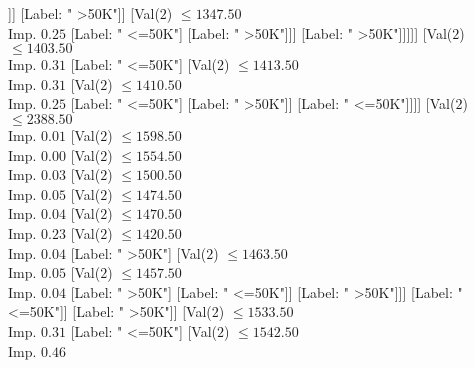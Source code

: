 \documentclass[margin=10pt]{standalone}
\begin{document}
\begin{forest}
																																	[Label: " >50K"]
																																	[Val($2$) $ \leq 1306.50$ \\ Imp. $0.02$
																																		[Label: " <=50K"]
																																		[Label: " >50K"]]]
																																[Label: " >50K"]]
																															[Val($2$) $ \leq 1347.50$ \\ Imp. $0.25$
																																[Label: " <=50K"]
																																[Label: " >50K"]]]
																														[Label: " >50K"]]]]]
																										[Val($2$) $ \leq 1403.50$ \\ Imp. $0.31$
																											[Label: " <=50K"]
																											[Val($2$) $ \leq 1413.50$ \\ Imp. $0.31$
																												[Val($2$) $ \leq 1410.50$ \\ Imp. $0.25$
																													[Label: " <=50K"]
																													[Label: " >50K"]]
																												[Label: " <=50K"]]]]
																									[Val($2$) $ \leq 2388.50$ \\ Imp. $0.01$
																										[Val($2$) $ \leq 1598.50$ \\ Imp. $0.00$
																											[Val($2$) $ \leq 1554.50$ \\ Imp. $0.03$
																												[Val($2$) $ \leq 1500.50$ \\ Imp. $0.05$
																													[Val($2$) $ \leq 1474.50$ \\ Imp. $0.04$
																														[Val($2$) $ \leq 1470.50$ \\ Imp. $0.23$
																															[Val($2$) $ \leq 1420.50$ \\ Imp. $0.04$
																																[Label: " >50K"]
																																[Val($2$) $ \leq 1463.50$ \\ Imp. $0.05$
																																	[Val($2$) $ \leq 1457.50$ \\ Imp. $0.04$
																																		[Label: " >50K"]
																																		[Label: " <=50K"]]
																																	[Label: " >50K"]]]
																															[Label: " <=50K"]]
																														[Label: " >50K"]]
																													[Val($2$) $ \leq 1533.50$ \\ Imp. $0.31$
																														[Label: " <=50K"]
																														[Val($2$) $ \leq 1542.50$ \\ Imp. $0.46$

\end{forest}
\end{document}
